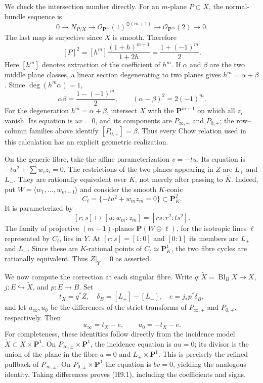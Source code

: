 \documentclass[11pt,a4paper]{article}
\begin{document}
We check the intersection number directly. For an $m$-plane $P\subset X$,
the normal-bundle sequence is
\[
 0\longrightarrow N_{P/X}\longrightarrow
 \mathcal O_{\mathbf P^m}(1)^{\oplus(m+1)}
 \longrightarrow\mathcal O_{\mathbf P^m}(2)\longrightarrow0.
\]
The last map is surjective since $X$ is smooth. Therefore
\[
 [P]^2=[h^m]\frac{(1+h)^{m+1}}{1+2h}
       =\frac{1+(-1)^m}{2}.
\]
Here $[h^m]$ denotes extraction of the coefficient of $h^m$. If $\alpha$
and $\beta$ are the two middle plane classes, a linear section degenerating
to two planes gives $h^m=\alpha+\beta$. Since $\deg(h^m\alpha)=1$,
\[
 \alpha\beta=\frac{1-(-1)^m}{2},\qquad
 (\alpha-\beta)^2=2(-1)^m.
\]
For the degeneration $h^m=\alpha+\beta$, intersect $X$ with the
$\mathbf P^{m+1}$ on which all $z_i$ vanish. Its equation is $uv=0$, and
its components are $P_{\infty,+}$ and $P_{0,+}$; the row--column families
above identify $[P_{0,+}]=\beta$. Thus every Chow relation used in this
calculation has an explicit geometric realization.

On the generic fibre, take the affine parameterization $v=-t u$. Its
equation is $-t u^2+\sum w_i z_i=0$. The restrictions of the two planes
appearing in $Z$ are $L_+$ and $L_-$. They are rationally equivalent over
$K$, not merely after passing to $\overline K$. Indeed, put
$W=\langle w_1,\ldots,w_{m-1}\rangle$ and consider the smooth $K$-conic
\[
 C_t=\{-t u^2+w_mz_m=0\}\subset\mathbf P^2_K.
\]
It is parameterized by
\[
 [r:s]\longmapsto[u:w_m:z_m]=[rs:r^2:t s^2].
\]
The family of projective $(m-1)$-planes
$\mathbf P(W\oplus\ell)$, for the isotropic lines $\ell$ represented by
$C_t$, lies in $Y$. At $[r:s]=[1:0]$ and $[0:1]$ its members are $L_+$
and $L_-$. Since these are $K$-rational points of $C_t\simeq\mathbf P^1_K$,
the two fibre cycles are rationally equivalent. Thus $Z|_Y=0$ as asserted.

We now compute the correction at each singular fibre. Write
$q:\widetilde X=\operatorname{Bl}_{B}X\to X$,
$j:E\hookrightarrow\widetilde X$, and $p:E\to B$. Set
\[
 t_X=q^*Z,\quad \delta_B=[L_+]-[L_-],\quad
 e=j_*p^*\delta_B,
\]
and let $u_\infty,u_0$ be the differences of the strict transforms of
$P_{\infty,\pm}$ and $P_{0,\pm}$, respectively. Then
\[
 u_\infty=t_X-e,\qquad u_0=-t_X-e.                 \tag{H9.1}
\]
For completeness, these identities follow directly from the incidence
model $\widetilde X\subset X\times\mathbf P^1$. On
$P_{\infty,\pm}\times\mathbf P^1$, the incidence equation is $a u=0$;
its divisor is the union of the plane in the fibre $a=0$ and
$L_\pm\times\mathbf P^1$. This is precisely the refined pullback of
$P_{\infty,\pm}$. On $P_{0,\pm}\times\mathbf P^1$ the equation is
$b v=0$, yielding the analogous identity. Taking differences proves
(H9.1), including the coefficients and signs.
\end{document}
